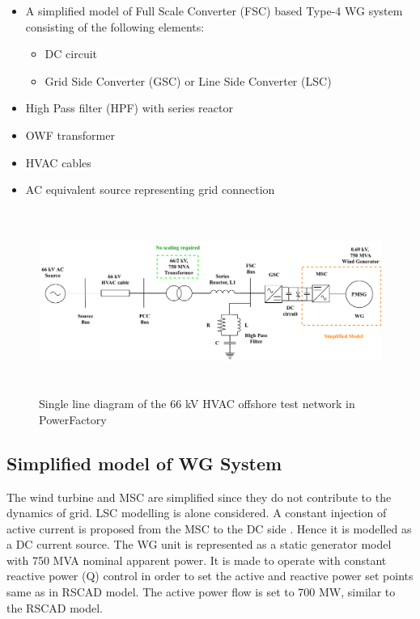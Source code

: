 \begin{itemize}
    \item A simplified model of Full Scale Converter (FSC) based Type-4 \gls{WG} system consisting of the following elements:
    \begin{itemize}
        \item \gls{DC} circuit
        \item Grid Side Converter (\gls{GSC}) or Line Side Converter (\gls{LSC})
    \end{itemize}
    \item High Pass filter (\gls{HPF}) with series reactor
    \item \gls{OWF} transformer
    \item \gls{HVAC} cables  
    \item \gls{AC} equivalent source representing grid connection
\end{itemize}

\begin{figure}[H]
\centering
    \includegraphics[height = 6cm,width = 16.5cm]{Diagrams/Chapter_3/WT1_AC_PFD.pdf}
    \caption{Single line diagram of the 66 kV HVAC offshore test network in PowerFactory}
    \label{fig:WT1_Model_PFD_comp}
\end{figure}

\subsection{Simplified model of WG System}
The wind turbine and \gls{MSC} are simplified since they do not contribute to the dynamics of grid. \gls{LSC} modelling is alone considered. A constant injection of active current is proposed from the \gls{MSC} to the \gls{DC} side \cite{korai_dynamic_2019}. Hence it is modelled as a \gls{DC} current source. The \gls{WG} unit is represented as a static generator model with 750 MVA nominal apparent power. It is made to operate with constant reactive power (Q) control in order to set the active and reactive power set points same as in RSCAD model. The active power flow is set to 700 MW, similar to the RSCAD model.

